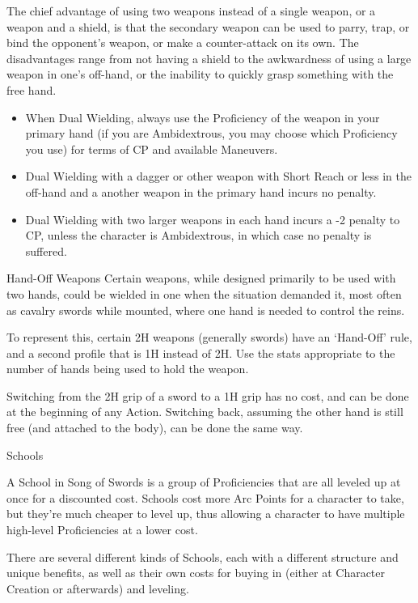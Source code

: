 \documentclass[oneside,11pt,english]{book}
\begin{document}
The chief advantage of using two weapons instead of a single weapon, or a weapon and a shield, is that 
the secondary weapon can be used to parry, trap, or bind the opponent’s weapon, or make a counter-attack 
on its own. The disadvantages range from not having a shield to the awkwardness of using a large weapon 
in one’s off-hand, or the inability to quickly grasp something with the free hand. 
\begin{itemize}
\item When Dual Wielding, always use the Proficiency of the weapon in your primary hand (if you are 
Ambidextrous, you may choose which Proficiency you use) for terms of CP and available 
Maneuvers. 
\item Dual Wielding with a dagger or other weapon with Short Reach or less in the off-hand and a 
another weapon in the primary hand incurs no penalty. 
\item Dual Wielding with two larger weapons in each hand incurs a -2 penalty to CP, unless the 
character is Ambidextrous, in which case no penalty is suffered. 
\end{itemize}
 

Hand-Off Weapons 
Certain weapons, while designed primarily to be used with two hands, could be wielded in one when the 
situation demanded it, most often as cavalry swords while mounted, where one hand is needed to control 
the reins. 

 

To represent this, certain 2H weapons (generally swords) have an ‘Hand-Off’ rule, and a second profile 
that is 1H instead of 2H. Use the stats appropriate to the number of hands being used to hold the weapon. 

 

Switching from the 2H grip of a sword to a 1H grip has no cost, and can be done at the beginning of any 
Action. Switching back, assuming the other hand is still free (and attached to the body), can be done the 
same way. 

 


Schools 

 

A School in Song of Swords is a group of Proficiencies that are all leveled up at once for a discounted 
cost. Schools cost more Arc Points for a character to take, but they’re much cheaper to level up, thus 
allowing a character to have multiple high-level Proficiencies at a lower cost. 

 

There are several different kinds of Schools, each with a different structure and unique benefits, as well as 
their own costs for buying in (either at Character Creation or afterwards) and leveling. 
\end{document}
